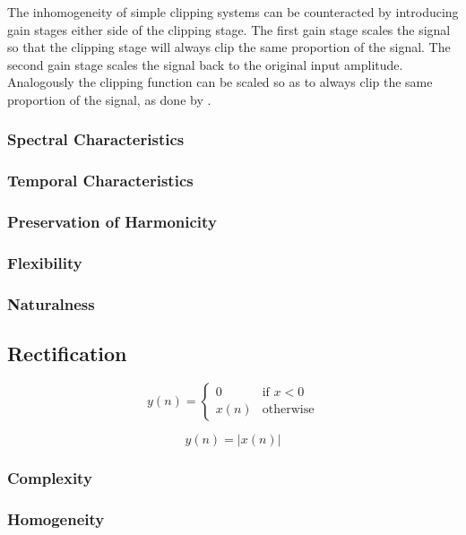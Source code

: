 			The inhomogeneity of simple clipping systems can be counteracted by introducing gain stages either
			side of the clipping stage. The first gain stage scales the signal so that the clipping stage will
			always clip the same proportion of the signal. The second gain stage scales the signal back to the
			original input amplitude. Analogously the clipping function can be scaled so as to always clip the
			same proportion of the signal, as done by \citet{deman2014adaptive}.

		\subsubsection*{Spectral Characteristics}
		\subsubsection*{Temporal Characteristics}
		\subsubsection*{Preservation of Harmonicity}
		\subsubsection*{Flexibility}
		\subsubsection*{Naturalness}

	\subsection{Rectification}
	\label{sec:Excitation-Rectification}
		\begin{equation}
			y(n) = \begin{cases}
				0 & \text{if $x < 0$} \\
				x(n) & \text{otherwise}
			\end{cases}
			\label{eq:Half-Wave-Rectification}
		\end{equation}

		\begin{equation}
			y(n) = |x(n)|
			\label{eq:Full-Wave-Rectification}
		\end{equation}

		\subsubsection*{Complexity}
		\subsubsection*{Homogeneity}
